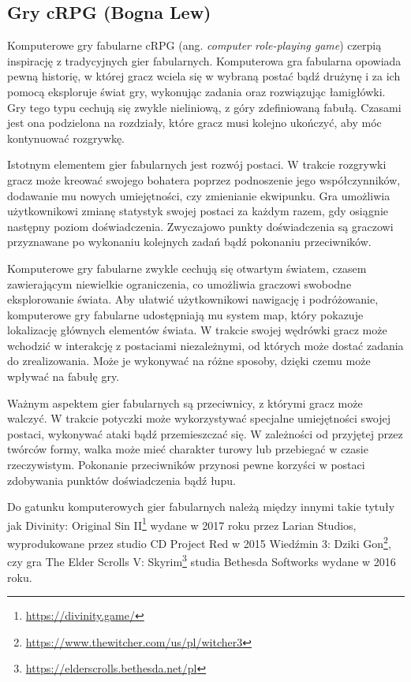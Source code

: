 \subsection{Gry cRPG (Bogna Lew)}\label{ss:rpg}
Komputerowe gry fabularne cRPG (ang. \textit{computer role-playing game}) czerpią inspirację z tradycyjnych gier fabularnych. Komputerowa
gra fabularna opowiada pewną historię, w której gracz wciela się w wybraną postać bądź drużynę i
za ich pomocą eksploruje świat gry, wykonując zadania oraz rozwiązując łamigłówki. Gry tego typu cechują się zwykle
nieliniową, z góry zdefiniowaną fabułą. Czasami jest ona podzielona na rozdziały, które gracz musi kolejno ukończyć, aby
móc kontynuować rozgrywkę.

Istotnym elementem gier fabularnych jest rozwój postaci. W trakcie rozgrywki gracz może kreować swojego bohatera
poprzez podnoszenie jego współczynników, dodawanie mu nowych umiejętności, czy zmienianie ekwipunku. Gra umożliwia
użytkownikowi zmianę statystyk swojej postaci za każdym razem, gdy osiągnie następny poziom doświadczenia. Zwyczajowo
punkty doświadczenia są graczowi przyznawane po wykonaniu kolejnych zadań bądź pokonaniu przeciwników.

Komputerowe gry fabularne zwykle cechują się otwartym światem, czasem zawierającym niewielkie ograniczenia, co umożliwia
graczowi swobodne eksplorowanie świata. Aby ułatwić użytkownikowi nawigację i podróżowanie, komputerowe gry fabularne
udostępniają mu system map, który pokazuje lokalizację głównych elementów świata. W trakcie swojej wędrówki gracz może
wchodzić w interakcję z postaciami niezależnymi, od których może dostać zadania do zrealizowania. Może je wykonywać na
różne sposoby, dzięki czemu może wpływać na fabułę gry.

Ważnym aspektem gier fabularnych są przeciwnicy, z którymi gracz może walczyć. W trakcie potyczki może wykorzystywać
specjalne umiejętności swojej postaci, wykonywać ataki bądź przemieszczać się. W zależności od przyjętej przez twórców
formy, walka może mieć charakter turowy lub przebiegać w czasie rzeczywistym. Pokonanie przeciwników przynosi pewne
korzyści w postaci zdobywania punktów doświadczenia bądź łupu.

Do gatunku komputerowych gier fabularnych należą między innymi takie tytuły jak Divinity: Original Sin II\footnote{\url{https://divinity.game/}} wydane w 2017
roku przez Larian Studios, wyprodukowane przez studio CD Project Red w 2015 Wiedźmin 3: Dziki Gon\footnote{\url{https://www.thewitcher.com/us/pl/witcher3}}, czy gra The Elder
Scrolls V: Skyrim\footnote{\url{https://elderscrolls.bethesda.net/pl}} studia Bethesda Softworks wydane w 2016 roku.
